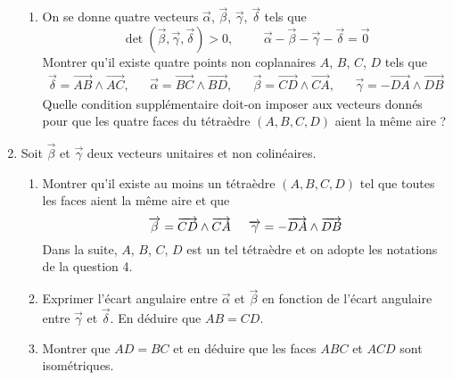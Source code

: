 \begin{enumerate}
\begin{enumerate}
 \item  On se donne quatre vecteurs $\overrightarrow{\alpha}$, $\overrightarrow{\beta}$, $\overrightarrow{\gamma}$, $\overrightarrow{\delta}$ tels que
\begin{displaymath}
 \det(\overrightarrow{\beta},\overrightarrow{\gamma},\overrightarrow{\delta}) > 0,\hspace{1cm}
\overrightarrow{\alpha} - \overrightarrow{\beta} - \overrightarrow{\gamma} - \overrightarrow{\delta} = \overrightarrow{0}
\end{displaymath}
Montrer qu'il existe quatre points non coplanaires $A$, $B$, $C$, $D$ tels que 
\begin{align*}
 \overrightarrow{\delta}=\overrightarrow{AB}\wedge \overrightarrow{AC} ,& &
 \overrightarrow{\alpha}=\overrightarrow{BC}\wedge \overrightarrow{BD} ,& &
 \overrightarrow{\beta}=\overrightarrow{CD}\wedge \overrightarrow{CA} ,& &
 \overrightarrow{\gamma}= - \overrightarrow{DA}\wedge \overrightarrow{DB}
\end{align*}
Quelle condition supplémentaire doit-on imposer aux vecteurs donnés pour que les quatre faces du tétraèdre $(A,B,C,D)$ aient la même aire ?
\end{enumerate}

\item Soit $\overrightarrow \beta$ et $\overrightarrow \gamma$ deux vecteurs unitaires et non colinéaires.
\begin{enumerate}
\item Montrer qu'il existe au moins un tétraèdre $(A, B,C,D)$ tel que toutes les faces aient la même aire et que 
\begin{displaymath}
 \overrightarrow{\beta}=\overrightarrow{CD}\wedge \overrightarrow{CA} \hspace{0.5cm}
 \overrightarrow{\gamma}= - \overrightarrow{DA}\wedge \overrightarrow{DB}
\end{displaymath}
Dans la suite, $A$, $B$, $C$, $D$ est un tel tétraèdre et on adopte les notations de la question 4. 
\item Exprimer l'écart angulaire entre $\overrightarrow \alpha$ et $\overrightarrow \beta$ en fonction de l'écart angulaire entre $\overrightarrow \gamma$ et $\overrightarrow \delta$. En déduire que $AB=CD$.
\item Montrer que $AD=BC$ et en déduire que les faces $ABC$ et $ACD$ sont isométriques. 
\end{enumerate}
\end{enumerate}
